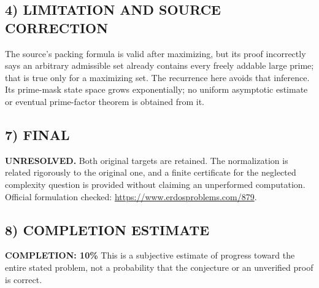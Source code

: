 \subsection*{4) LIMITATION AND SOURCE CORRECTION}
The source's packing formula is valid after maximizing, but its proof incorrectly says an arbitrary admissible set already contains every freely addable large prime; that is true only for a maximizing set. The recurrence here avoids that inference. Its prime-mask state space grows exponentially; no uniform asymptotic estimate or eventual prime-factor theorem is obtained from it.
\subsection*{7) FINAL}
\textbf{UNRESOLVED.} Both original targets are retained. The normalization is related rigorously to the original one, and a finite certificate for the neglected complexity question is provided without claiming an unperformed computation.
\noindent Official formulation checked: \url{https://www.erdosproblems.com/879}.

\subsection*{8) COMPLETION ESTIMATE}
\textbf{COMPLETION: 10\%}
This is a subjective estimate of progress toward the entire stated problem, not a probability that the conjecture or an unverified proof is correct.
